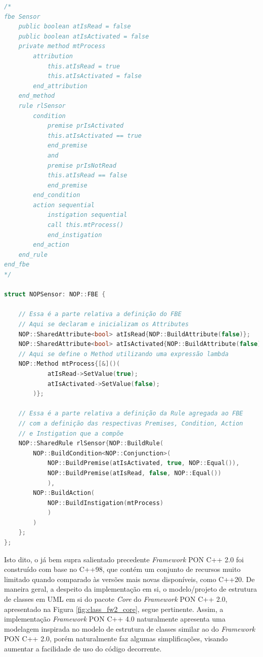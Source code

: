 \begin{lstlisting}[language=C++,
    caption = {Implementação do \textit{FBE} \textit{Sensor} em \textit{Framework} PON C++ 4.0},
    source = {Autoria própria},
    label = {cod:fw4_sensor}]
/*
fbe Sensor
    public boolean atIsRead = false
    public boolean atIsActivated = false
    private method mtProcess
        attribution
            this.atIsRead = true
            this.atIsActivated = false
        end_attribution
    end_method
    rule rlSensor
        condition
            premise prIsActivated
            this.atIsActivated == true
            end_premise
            and
            premise prIsNotRead
            this.atIsRead == false
            end_premise
        end_condition
        action sequential
            instigation sequential
            call this.mtProcess()
            end_instigation
        end_action
    end_rule
end_fbe
*/

struct NOPSensor: NOP::FBE {

    // Essa é a parte relativa a definição do FBE
    // Aqui se declaram e inicializam os Attributes
    NOP::SharedAttribute<bool> atIsRead{NOP::BuildAttribute(false)};
    NOP::SharedAttribute<bool> atIsActivated{NOP::BuildAttribute(false)};
    // Aqui se define o Method utilizando uma expressão lambda
    NOP::Method mtProcess{[&]()(
            atIsRead->SetValue(true);
            atIsActivated->SetValue(false);
        )};

    // Essa é a parte relativa a definição da Rule agregada ao FBE
    // com a definição das respectivas Premises, Condition, Action
    // e Instigation que a compõe
    NOP::SharedRule rlSensor{NOP::BuildRule(
        NOP::BuildCondition<NOP::Conjunction>( 
            NOP::BuildPremise(atIsActivated, true, NOP::Equal()), 
            NOP::BuildPremise(atIsRead, false, NOP::Equal())
            ),
        NOP::BuildAction(
            NOP::BuildInstigation(mtProcess)
            )
        )
    };
};
\end{lstlisting}

Isto dito, o já bem supra salientado precedente \textit{Framework} PON C++ 2.0
foi construído com base no C++98, que contém um conjunto de recursos muito
limitado quando comparado às versões mais novas disponíveis, como C++20. De
maneira geral, a despeito da implementação em si, o modelo/projeto de estrutura
de classes em UML em si do pacote \textit{Core} do \textit{Framework} PON C++
2.0, apresentado na Figura \ref{fig:class_fw2_core}, segue pertinente. Assim, a
implementação \textit{Framework} PON C++ 4.0 naturalmente apresenta uma
modelagem inspirada no modelo de estrutura de classes similar ao do
\textit{Framework} PON C++ 2.0, porém naturalmente faz algumas simplificações,
visando aumentar a facilidade de uso do código decorrente.

